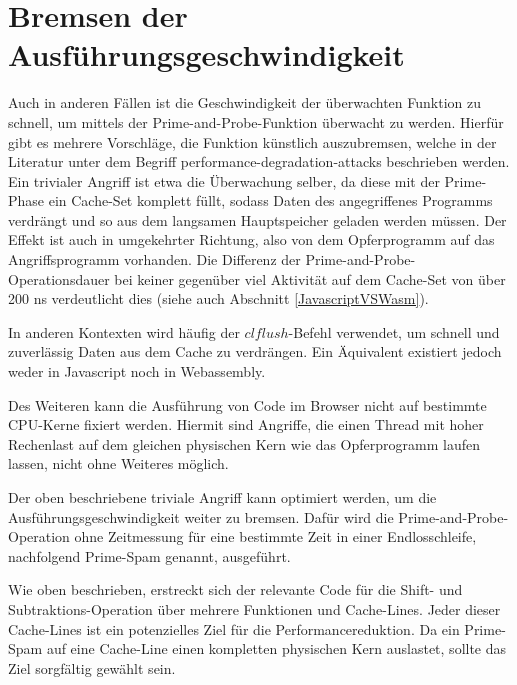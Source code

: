 \section{Bremsen der Ausführungsgeschwindigkeit}
\label{PerformanceDegSingleThread}

Auch in anderen Fällen ist die Geschwindigkeit der überwachten Funktion zu schnell, um mittels der Prime-and-Probe-Funktion überwacht zu werden.
Hierfür gibt es mehrere Vorschläge, die Funktion künstlich auszubremsen, welche in der Literatur \cite{MemoryLockingWu,MemoryLockingRisenpart,MemoryLockingJavaAndroid} unter dem Begriff performance-degradation-attacks beschrieben werden.
Ein trivialer Angriff ist etwa die Überwachung selber, da diese mit der Prime-Phase ein Cache-Set komplett füllt, sodass Daten des angegriffenes Programms verdrängt und so aus dem langsamen Hauptspeicher geladen werden müssen.
Der Effekt ist auch in umgekehrter Richtung, also von dem Opferprogramm auf das Angriffsprogramm vorhanden.
Die Differenz der Prime-and-Probe-Operationsdauer bei keiner gegenüber viel Aktivität auf dem Cache-Set von über 200 ns verdeutlicht dies (siehe auch Abschnitt \ref{JavascriptVSWasm}).

In anderen Kontexten wird häufig der $clflush$-Befehl verwendet, um schnell und zuverlässig Daten aus dem Cache zu verdrängen. 
Ein Äquivalent existiert jedoch weder in Javascript noch in Webassembly.

Des Weiteren kann die Ausführung von Code im Browser nicht auf bestimmte CPU-Kerne fixiert werden. Hiermit sind Angriffe, die einen Thread mit hoher Rechenlast auf dem gleichen physischen Kern wie das Opferprogramm laufen lassen, nicht ohne Weiteres möglich.

Der oben beschriebene triviale Angriff kann optimiert werden, um die Ausführungsgeschwindigkeit weiter zu bremsen. 
Dafür wird die Prime-and-Probe-Operation ohne Zeitmessung für eine bestimmte Zeit in einer Endlosschleife, nachfolgend Prime-Spam genannt, ausgeführt.

Wie oben beschrieben, erstreckt sich der relevante Code für die Shift- und Subtraktions-Operation über mehrere Funktionen und Cache-Lines.
Jeder dieser Cache-Lines ist ein potenzielles Ziel für die Performancereduktion.
Da ein Prime-Spam auf eine Cache-Line einen kompletten physischen Kern auslastet, sollte das Ziel sorgfältig gewählt sein.

